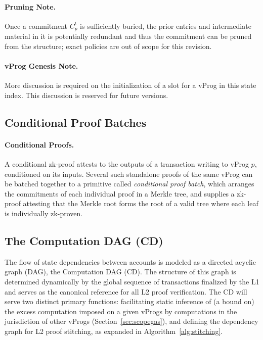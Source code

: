 \documentclass[onecolumn, 9pt, a4paper]{extarticle}
\begin{document}
\paragraph{Pruning Note.} Once a commitment $C^t_p$ is sufficiently buried, the prior entries and intermediate
material in it is potentially redundant and thus the commitment can be pruned from the structure; exact policies are out of scope for this revision.

\paragraph{vProg Genesis Note.}  More discussion is required on the initialization of a slot for a vProg in this state index. This discussion is reserved for future versions.

\subsection{Conditional Proof Batches}\label{sec:cond-batch}
\paragraph{Conditional Proofs.} A conditional zk-proof attests to the outputs of a transaction writing to vProg $p$, conditioned on its inputs.
Several such standalone proofs of the same vProg can be batched together to a primitive called \emph{conditional
proof batch}, which arranges the commitments of each individual proof in a Merkle tree, and supplies a zk-proof
attesting that the Merkle root forms the root of a valid tree where each leaf is individually zk-proven.

\subsection{The Computation DAG (CD)}\label{sec:cd}
The flow of state dependencies between accounts is modeled as a directed acyclic graph (DAG), the Computation
DAG (CD). The structure of this graph is determined dynamically by the global sequence of transactions finalized
by the L1 and serves as the canonical reference for all L2 proof verification. The CD will serve two distinct primary
functions: facilitating static inference of (a bound on) the excess computation imposed on a given vProgs by
computations in the jurisdiction of other vProgs (Section~\ref{sec:scopegas}), and defining the dependency graph
for L2 proof stitching, as expanded in Algorithm~\ref{alg:stitching}.
\end{document}
